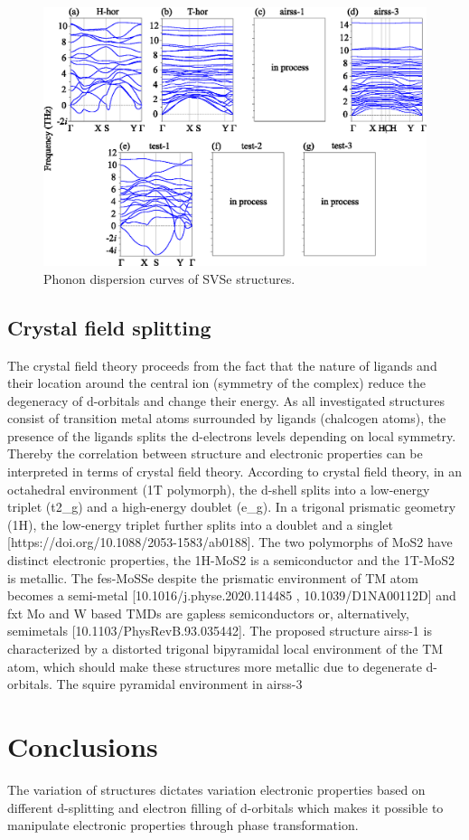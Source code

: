 \documentclass[a4paperm]{article}
\begin{document}
\begin{figure}[H]
	\includegraphics[width=\textwidth]{phon_svse.eps}
	\caption{Phonon dispersion curves of SVSe structures. }
	\label{phon_svse}
\end{figure}
\subsection{Crystal field splitting}
The crystal field theory proceeds from the fact that the nature of ligands and their location around the central ion (symmetry of the complex) reduce the degeneracy of d-orbitals and change their energy. As all investigated structures consist of transition metal atoms surrounded by ligands (chalcogen atoms), the presence of the ligands splits the d-electrons levels depending on local symmetry. Thereby the correlation between structure and electronic properties can be interpreted in terms of crystal field theory. According to crystal field theory, in an octahedral environment (1T polymorph), the d-shell splits into a low-energy triplet (t2_g) and a high-energy doublet (e_g). In a trigonal prismatic geometry (1H), the low-energy triplet further splits into a doublet and a singlet [https://doi.org/10.1088/2053-1583/ab0188]. The two polymorphs of MoS2 have distinct electronic properties, the 1H-MoS2 is a semiconductor and the 1T-MoS2 is metallic. The fes-MoSSe despite the prismatic environment of TM atom becomes a semi-metal [10.1016/j.physe.2020.114485 , 10.1039/D1NA00112D] and fxt Mo and W based TMDs are gapless semiconductors or, alternatively, semimetals [10.1103/PhysRevB.93.035442]. The proposed structure airss-1 is characterized by a distorted trigonal bipyramidal local environment of the TM atom, which should make these structures more metallic due to degenerate d-orbitals. The squire pyramidal environment in airss-3 


\section{Conclusions}
The variation of structures dictates variation electronic properties based on different d-splitting and electron filling of d-orbitals which makes it possible to manipulate electronic properties through phase transformation.


\end{document}
